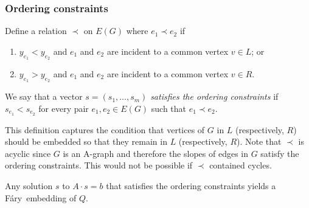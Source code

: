 \documentclass{patmorin}
\newcommand{\Fary}{Fáry}
\begin{document}
\subsubsection{Ordering constraints}

Define a relation $\prec$ on $E(G)$ where $e_1 \prec e_2$
if
\begin{enumerate}
  \item $y_{e_1} < y_{e_2}$ and $e_1$ and $e_2$ are incident to a common vertex
  $v\in L$; or
  \item $y_{e_1} > y_{e_2}$ and $e_1$ and $e_2$ are incident to a common vertex $v\in R$.
\end{enumerate}
We say that a vector $s=(s_1,\ldots,s_m)$ \emph{satisfies the ordering constraints} if $s_{e_1} <
s_{e_2}$ for every pair $e_1,e_2\in E(G)$ such that $e_1\prec e_2$.  

This definition captures the condition that vertices of $G$ in $L$
(respectively, $R$) should be embedded so that they remain in $L$
(respectively, $R$).  Note that $\prec$ is acyclic since $G$ is an A-graph
and therefore the slopes of edges in $G$ satisfy the ordering constraints.
This would not be possible if $\prec$ contained cycles.

\begin{lem}
   Any solution $s$ to $A\cdot s=b$ that satisfies
 the ordering constraints %
 yields a
   \Fary\ embedding of $Q$.
\end{lem}
\end{document}
